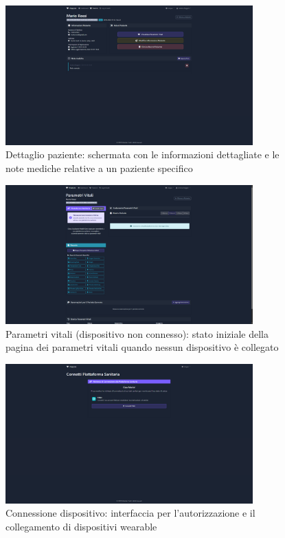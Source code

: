 \documentclass[12pt,a4paper,oneside]{report}
\begin{document}
\begin{figure}[H]
    \centering
    \includegraphics[width=0.85\textwidth]{images/screen/details.png}
    \caption{Dettaglio paziente: schermata con le informazioni dettagliate e le note mediche relative a un paziente specifico}
    \label{fig:patient-details}
\end{figure}

\begin{figure}[H]
    \centering
    \includegraphics[width=0.85\textwidth]{images/screen/unconnected.png}
    \caption{Parametri vitali (dispositivo non connesso): stato iniziale della pagina dei parametri vitali quando nessun dispositivo è collegato}
    \label{fig:unconnected}
\end{figure}

\begin{figure}[H]
    \centering
    \includegraphics[width=0.85\textwidth]{images/screen/connection.png}
    \caption{Connessione dispositivo: interfaccia per l'autorizzazione e il collegamento di dispositivi wearable}
    \label{fig:connection}
\end{figure}
\end{document}
